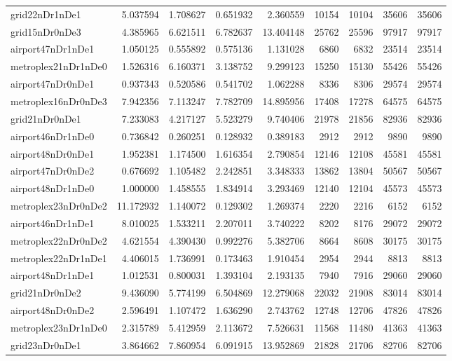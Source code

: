 \begin{longtable}{|l|r|r|r|r|r|r|r|r|}
grid22nDr1nDe1 & 5.037594 & 1.708627 & 0.651932 & 2.360559 & 10154 & 10104 & 35606 & 35606 \\
grid15nDr0nDe3 & 4.385965 & 6.621511 & 6.782637 & 13.404148 & 25762 & 25596 & 97917 & 97917 \\
airport47nDr1nDe1 & 1.050125 & 0.555892 & 0.575136 & 1.131028 & 6860 & 6832 & 23514 & 23514 \\
metroplex21nDr1nDe0 & 1.526316 & 6.160371 & 3.138752 & 9.299123 & 15250 & 15130 & 55426 & 55426 \\
airport47nDr0nDe1 & 0.937343 & 0.520586 & 0.541702 & 1.062288 & 8336 & 8306 & 29574 & 29574 \\
metroplex16nDr0nDe3 & 7.942356 & 7.113247 & 7.782709 & 14.895956 & 17408 & 17278 & 64575 & 64575 \\
grid21nDr0nDe1 & 7.233083 & 4.217127 & 5.523279 & 9.740406 & 21978 & 21856 & 82936 & 82936 \\
airport46nDr1nDe0 & 0.736842 & 0.260251 & 0.128932 & 0.389183 & 2912 & 2912 & 9890 & 9890 \\
airport48nDr0nDe1 & 1.952381 & 1.174500 & 1.616354 & 2.790854 & 12146 & 12108 & 45581 & 45581 \\
airport47nDr0nDe2 & 0.676692 & 1.105482 & 2.242851 & 3.348333 & 13862 & 13804 & 50567 & 50567 \\
airport48nDr1nDe0 & 1.000000 & 1.458555 & 1.834914 & 3.293469 & 12140 & 12104 & 45573 & 45573 \\
metroplex23nDr0nDe2 & 11.172932 & 1.140072 & 0.129302 & 1.269374 & 2220 & 2216 & 6152 & 6152 \\
airport46nDr1nDe1 & 8.010025 & 1.533211 & 2.207011 & 3.740222 & 8202 & 8176 & 29072 & 29072 \\
metroplex22nDr0nDe2 & 4.621554 & 4.390430 & 0.992276 & 5.382706 & 8664 & 8608 & 30175 & 30175 \\
metroplex22nDr1nDe1 & 4.406015 & 1.736991 & 0.173463 & 1.910454 & 2954 & 2944 & 8813 & 8813 \\
airport48nDr1nDe1 & 1.012531 & 0.800031 & 1.393104 & 2.193135 & 7940 & 7916 & 29060 & 29060 \\
grid21nDr0nDe2 & 9.436090 & 5.774199 & 6.504869 & 12.279068 & 22032 & 21908 & 83014 & 83014 \\
airport48nDr0nDe2 & 2.596491 & 1.107472 & 1.636290 & 2.743762 & 12748 & 12706 & 47826 & 47826 \\
metroplex23nDr1nDe0 & 2.315789 & 5.412959 & 2.113672 & 7.526631 & 11568 & 11480 & 41363 & 41363 \\
grid23nDr0nDe1 & 3.864662 & 7.860954 & 6.091915 & 13.952869 & 21828 & 21706 & 82706 & 82706 \\

\end{longtable}
